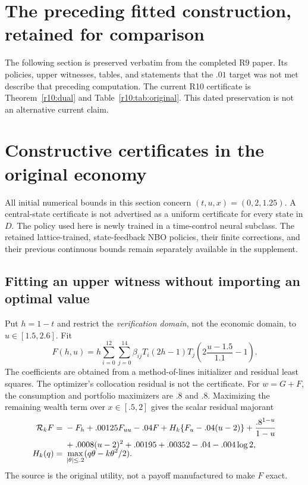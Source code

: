 \section{The preceding fitted construction, retained for comparison}\label{r10:retained}
The following section is preserved verbatim from the completed R9 paper. Its policies, upper witnesses, tables, and statements that the $.01$ target was not met describe that preceding computation. The current R10 certificate is Theorem~\ref{r10:dual} and Table~\ref{r10:tab:original}. This dated preservation is not an alternative current claim.

\section{Constructive certificates in the original economy}\label{r9:construct}
All initial numerical bounds in this section concern $(t,u,x)=(0,2,1.25)$. A central-state certificate is not advertised as a uniform certificate for every state in $D$. The policy used here is newly trained in a time-control neural subclass. The retained lattice-trained, state-feedback NBO policies, their finite corrections, and their previous continuous bounds remain separately available in the supplement.

\subsection{Fitting an upper witness without importing an optimal value}
Put $h=1-t$ and restrict the \emph{verification domain}, not the economic domain, to $u\in[1.5,2.6]$. Fit
\[
 F(h,u)=h\sum_{i=0}^{12}\sum_{j=0}^{14}\beta_{ij}
 T_i(2h-1)T_j\!\left(2\frac{u-1.5}{1.1}-1\right).
\]
The coefficients are obtained from a method-of-lines initializer and residual least squares. The optimizer's collocation residual is not the certificate. For $w=G+F$, the consumption and portfolio maximizers are $.8$ and $.8$. Maximizing the remaining wealth term over $x\in[.5,2]$ gives the scalar residual majorant
\begin{align}
 \mathcal R_kF={}&-F_h+.00125F_{uu}-.04F+
 H_k\{F_u-.04(u-2)\}+\frac{.8^{1-u}}{1-u}\\
 &+.0008(u-2)^2+.00195+.00352-.04-.004\log2,\label{r9:reduced}\\[-2mm]
 H_k(q)={}&\max_{|\theta|\leq.2}(q\theta-k\theta^2/2).\notag
\end{align}
The source is the original utility, not a payoff manufactured to make $F$ exact.

